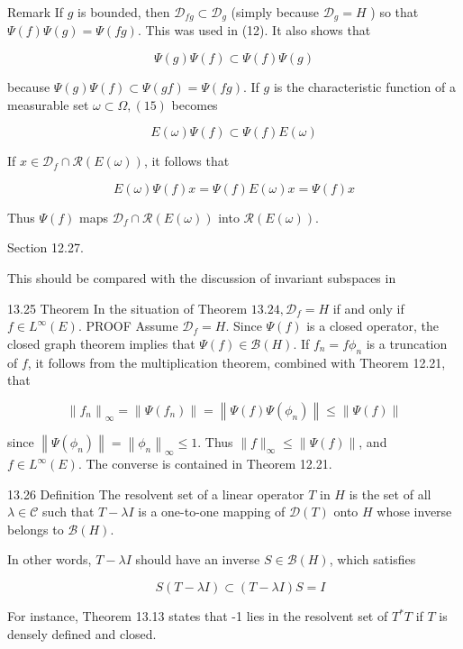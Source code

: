 \documentclass[10pt]{article}
\begin{document}
Remark If $g$ is bounded, then $\mathscr{D}_{f g} \subset \mathscr{D}_{g}$ (simply because $\mathscr{D}_{g}=H$ ) so that $\Psi(f) \Psi(g)=\Psi(f g)$. This was used in (12). It also shows that

$$
\Psi(g) \Psi(f) \subset \Psi(f) \Psi(g)
$$

because $\Psi(g) \Psi(f) \subset \Psi(g f)=\Psi(f g)$. If $g$ is the characteristic function of a measurable set $\omega \subset \Omega,(15)$ becomes

$$
E(\omega) \Psi(f) \subset \Psi(f) E(\omega)
$$

If $x \in \mathscr{D}_{f} \cap \mathscr{R}(E(\omega))$, it follows that

$$
E(\omega) \Psi(f) x=\Psi(f) E(\omega) x=\Psi(f) x
$$

Thus $\Psi(f)$ maps $\mathscr{D}_{f} \cap \mathscr{R}(E(\omega))$ into $\mathscr{R}(E(\omega))$.

Section 12.27.

This should be compared with the discussion of invariant subspaces in

13.25 Theorem In the situation of Theorem $13.24, \mathscr{D}_{f}=H$ if and only if $f \in L^{\infty}(E)$. PROOF Assume $\mathscr{D}_{f}=H$. Since $\Psi(f)$ is a closed operator, the closed graph theorem implies that $\Psi(f) \in \mathscr{B}(H)$. If $f_{n}=f \phi_{n}$ is a truncation of $f$, it follows from the multiplication theorem, combined with Theorem 12.21, that

$$
\left\|f_{n}\right\|_{\infty}=\left\|\Psi\left(f_{n}\right)\right\|=\left\|\Psi(f) \Psi\left(\phi_{n}\right)\right\| \leq\|\Psi(f)\|
$$

since $\left\|\Psi\left(\phi_{n}\right)\right\|=\left\|\phi_{n}\right\|_{\infty} \leq 1$. Thus $\|f\|_{\infty} \leq\|\Psi(f)\|$, and $f \in L^{\infty}(E)$. The converse is contained in Theorem 12.21.

13.26 Definition The resolvent set of a linear operator $T$ in $H$ is the set of all $\lambda \in \mathscr{C}$ such that $T-\lambda I$ is a one-to-one mapping of $\mathscr{D}(T)$ onto $H$ whose inverse belongs to $\mathscr{B}(H)$.

In other words, $T-\lambda I$ should have an inverse $S \in \mathscr{B}(H)$, which satisfies

$$
\quad S(T-\lambda I) \subset(T-\lambda I) S=I
$$

For instance, Theorem 13.13 states that -1 lies in the resolvent set of $T^{*} T$ if $T$ is densely defined and closed.
\end{document}

